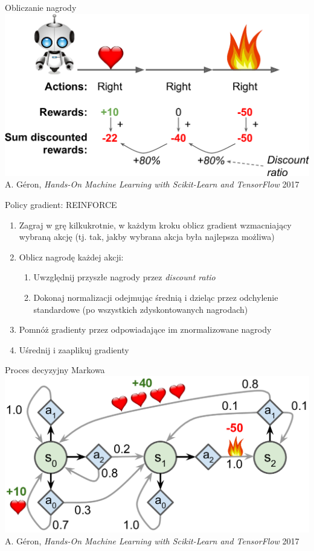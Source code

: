 \documentclass{sa}
\begin{document}
\begin{frame}{Obliczanie nagrody}
\centering
\includegraphics[width=\textwidth]{mlst_1606.png}
{\vfill\footnotesize A. Géron, \emph{Hands-On Machine Learning with Scikit-Learn and TensorFlow} 2017}
\end{frame}

\begin{frame}{Policy gradient: REINFORCE}
\begin{enumerate}
\item<+-> Zagraj w grę kilkukrotnie, w każdym kroku oblicz gradient wzmacniający wybraną akcję (tj. tak, jakby wybrana akcja była najlepsza możliwa)
\item<+-> Oblicz nagrodę każdej akcji:
\begin{enumerate}
\item<+-> Uwzględnij przyszłe nagrody przez \emph{discount ratio}
\item<+-> Dokonaj normalizacji odejmując średnią i dzieląc przez odchylenie standardowe (po wszystkich zdyskontowanych nagrodach)
\end{enumerate}
\item<+-> Pomnóż gradienty przez odpowiadające im znormalizowane nagrody
\item<+-> Uśrednij i zaaplikuj gradienty
\end{enumerate}
\end{frame}

\begin{frame}{Proces decyzyjny Markowa}
\centering
\includegraphics[width=\textwidth]{mlst_1608.png}
{\vfill\footnotesize A. Géron, \emph{Hands-On Machine Learning with Scikit-Learn and TensorFlow} 2017}
\end{frame}
\end{document}
